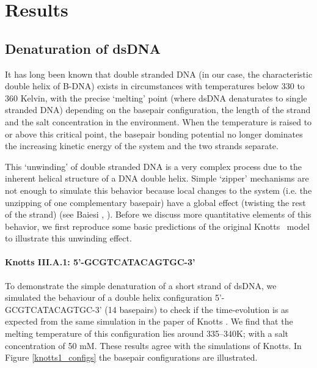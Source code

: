 \section{Results}

\subsection{Denaturation of dsDNA}

It has long been known that double stranded DNA (in our case, the characteristic double helix of B-DNA) exists in circumstances with temperatures below 330 to 360 Kelvin, with the precise `melting' point (where dsDNA denaturates to single stranded DNA) depending on the basepair configuration, the length of the strand and the salt concentration in the environment.
When the temperature is raised to or above this critical point, the basepair bonding potential no longer dominates the increasing kinetic energy of the system and the two strands separate. 

This `unwinding' of double stranded DNA is a very complex process due to the inherent helical structure of a DNA double helix.
Simple `zipper' mechanisms are not enough to simulate this behavior because local changes to the system (i.e. the unzipping of one complementary basepair) have a global effect (twisting the rest of the strand) (see Baiesi \etal, \cite{carlon2010unwinding}).
Before we discuss more quantitative elements of this behavior, we first reproduce some basic predictions of the original Knotts \etal\ model \cite{knotts2007coarse} to illustrate this unwinding effect.

\paragraph{Knotts III.A.1: 5'-GCGTCATACAGTGC-3'} To demonstrate the simple denaturation of a short strand of dsDNA, we simulated the behaviour of a double helix configuration 5'-GCGTCATACAGTGC-3' (14 basepairs) to check if the time-evolution is as expected from the same simulation in the paper of Knotts \etal \cite{knotts2007coarse}.
We find that the melting temperature of this configuration lies around 335--340K; with a salt concentration of 50 mM.
These results agree with the simulations of Knotts. In Figure \ref{knotts1_configs} the basepair configurations are illustrated.

